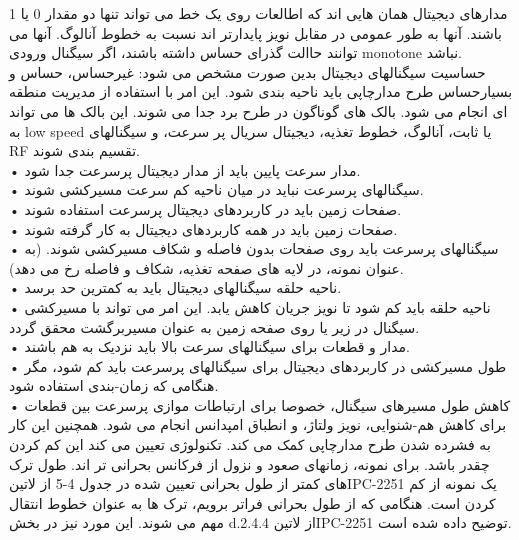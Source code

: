 مدارهای دیجیتال همان هایی اند که اطالعات روی یک خط می تواند تنها دو مقدار 0 یا 1 باشند.
آنها به طور عمومی در مقابل نویز پایدارتر اند نسبت به خطوط آنالوگ. آنها می توانند حاالت گذرای
حساس داشته باشند، اگر سیگنال ورودی monotone نباشد.\\
حساسیت سیگنالهای دیجیتال بدین صورت مشخص می شود: غیرحساس، حساس و
بسیارحساس
طرح مدارچاپی باید ناحیه بندی شود. این امر با استفاده از مدیریت منطقه ای انجام می
شود. بالک های گوناگون در طرح برد جدا می شوند. این بالک ها می تواند به low
speed یا ثابت، آنالوگ، خطوط تغذیه، دیجیتال سریال پر سرعت، و سیگنالهای RF تقسیم
بندی شوند.\\
• مدار سرعت پایین باید از مدار دیجیتال پرسرعت جدا شود.\\
• سیگنالهای پرسرعت نباید در میان ناحیه کم سرعت مسیرکشی شوند.\\
• صفحات زمین باید در کاربردهای دیجیتال پرسرعت استفاده شوند.\\
• صفحات زمین باید در همه کاربردهای دیجیتال به کار گرفته شوند.\\
• سیگنالهای پرسرعت باید روی صفحات بدون فاصله و شکاف مسیرکشی شوند. (به عنوان
نمونه، در لایه های صفحه تغذیه، شکاف و فاصله رخ می دهد).\\
• ناحیه حلقه سیگنالهای دیجیتال باید به کمترین حد برسد.\\
• ناحیه حلقه باید کم شود تا نویز جریان کاهش یابد. این امر می تواند با مسیرکشی سیگنال
در زیر یا روی صفحه زمین به عنوان مسیربرگشت محقق گردد.\\
• مدار و قطعات برای سیگنالهای سرعت بالا باید نزدیک به هم باشند.\\
• طول مسیرکشی در کاربردهای دیجیتال برای سیگنالهای پرسرعت باید کم شود، مگر هنگامی که
زمان-بندی استفاده شود.\\
• کاهش طول مسیرهای سیگنال، خصوصا برای ارتباطات موازی پرسرعت بین قطعات برای
کاهش هم-شنوایی، نویز ولتاژ، و انطباق امپدانس انجام می شود. همچنین این کار به فشرده شدن
طرح مدارچاپی کمک می کند. تکنولوژی تعیین می کند این کم کردن چقدر باشد. برای نمونه،
زمانهای صعود و نزول از فرکانس بحرانی تر اند. طول ترک های کمتر از طول بحرانی تعیین شده در
جدول 4-5 از ‌لاتین{IPC-2251} یک نمونه از کم کردن است. هنگامی که از طول بحرانی فراتر برویم، ترک
ها به عنوان خطوط انتقال مهم می شوند. این مورد نیز در بخش d.2.4.4 از ‌لاتین{IPC-2251} توضیح داده شده است. 

